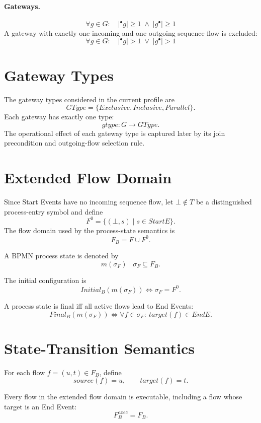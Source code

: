 \documentclass[11pt,a4paper]{article}
\newcommand{\StartE}{\mathit{StartE}}
\newcommand{\EndE}{\mathit{EndE}}
\newcommand{\GType}{\mathit{GType}}
\newcommand{\gtype}{\mathit{gtype}}
\begin{document}
\paragraph{Gateways.}
\[
\forall g \in G:\quad
|{}^{\bullet}g| \geq 1
\;\land\;
|g^{\bullet}| \geq 1
\tag{WF-G1}
\]
A gateway with exactly one incoming and one outgoing sequence flow is excluded:
\[
\forall g \in G:\quad
|{}^{\bullet}g| > 1
\;\lor\;
|g^{\bullet}| > 1
\tag{WF-G2}
\]

\section{Gateway Types}

The gateway types considered in the current profile are
\[
\GType = \{ \mathit{Exclusive}, \mathit{Inclusive}, \mathit{Parallel} \}.
\]
Each gateway has exactly one type:
\[
\gtype : G \rightarrow \GType.
\]
The operational effect of each gateway type is captured later by its join precondition and outgoing-flow selection rule.




\section{Extended Flow Domain}

Since Start Events have no incoming sequence flow, let $\bot \notin T$ be a distinguished process-entry symbol and define
\[
F^{0} = \{ (\bot, s) \mid s \in \StartE \}.
\]
The flow domain used by the process-state semantics is
\[
F_B = F \cup F^{0}.
\]

A BPMN process state is denoted by
\[
m(\sigma_F) \mid \sigma_F \subseteq F_B.
\]

The initial configuration is
\[
\mathit{Initial}_B(m(\sigma_F))
\iff
\sigma_F = F^{0}.
\]

A process state is final iff all active flows lead to End Events:
\[
\mathit{Final}_B(m(\sigma_F))
\iff
\forall f \in \sigma_F:\ \mathit{target}(f) \in \EndE.
\]

\section{State-Transition Semantics}

For each flow $f = (u, t) \in F_B$, define
\[
\mathit{source}(f) = u,
\qquad
\mathit{target}(f) = t.
\]

Every flow in the extended flow domain is executable, including a flow whose
target is an End Event:
\[
F_B^{exec}
=F_B.
\]
\end{document}
